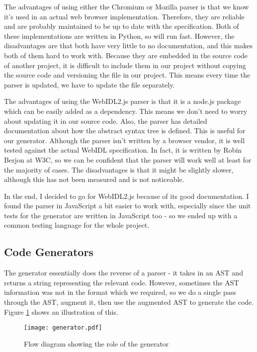 The advantages of using either the Chromium or Mozilla parser is that we know it's used in an actual web browser implementation. Therefore, they are reliable and are probably maintained to be up to date with the specification. Both of these implementations are written in Python, so will run fast. However, the disadvantages are that both have very little to no documentation, and this makes both of them hard to work with. Because they are embedded in the source code of another project, it is difficult to include them in our project without copying the source code and versioning the file in our project. This means every time the parser is updated, we have to update the file separately.

The advantages of using the WebIDL2.js parser is that it is a node.js package which can be easily added as a dependency. This means we don't need to worry about updating it in our source code. Also, the parser has detailed documentation about how the abstract syntax tree is defined. This is useful for our generator. Although the parser isn't written by a browser vendor, it is well tested against the actual WebIDL specification. In fact, it is written by Robin Berjon at W3C, so we can be confident that the parser will work well at least for the majority of cases. The disadvantages is that it might be slightly slower, although this has not been measured and is not noticeable. 

In the end, I decided to go for WebIDL2.js because of its good documentation. I found the parser in JavaScript a bit easier to work with, especially since the unit tests for the generator are written in JavaScript too - so we ended up with a common testing language for the whole project.




\subsection{Code Generators} %
\label{sub:code_generators_design}
The generator essentially does the reverse of a parser - it takes in an AST and returns a string representing the relevant code. However, sometimes the AST information was not in the format which we required, so we do a single pass through the AST, augment it, then use the augmented AST to generate the code. Figure \ref{fig:generator-diagram} shows an illustration of this.

\begin{figure}
    \centering
    \texttt{[image: generator.pdf]} 
    \caption{Flow diagram showing the role of the generator}
    \label{fig:generator-diagram}
\end{figure}

